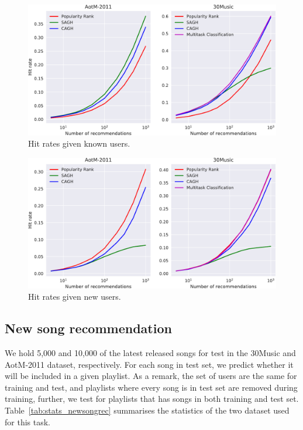 \begin{figure}[!h]
\centering
\includegraphics[width=\linewidth]{fig/hitrate-plgen1.pdf}
\caption{Hit rates given known users.}
\end{figure}



\begin{figure}[!h]
\centering
\includegraphics[width=\linewidth]{fig/hitrate-plgen2.pdf}
\caption{Hit rates given new users.}
\end{figure}



\subsection{New song recommendation}
\label{ssec:newsongrec}

We hold 5,000 and 10,000 of the latest released songs for test in the 30Music and AotM-2011 dataset, respectively.
For each song in test set, we predict whether it will be included in a given playlist.
As a remark, the set of users are the same for training and test, 
and playlists where every song is in test set are removed during training,
further, we test for playlists that has songs in both training and test set.
Table~\ref{tab:stats_newsongrec} summarises the statistics of the two dataset used for this task.

